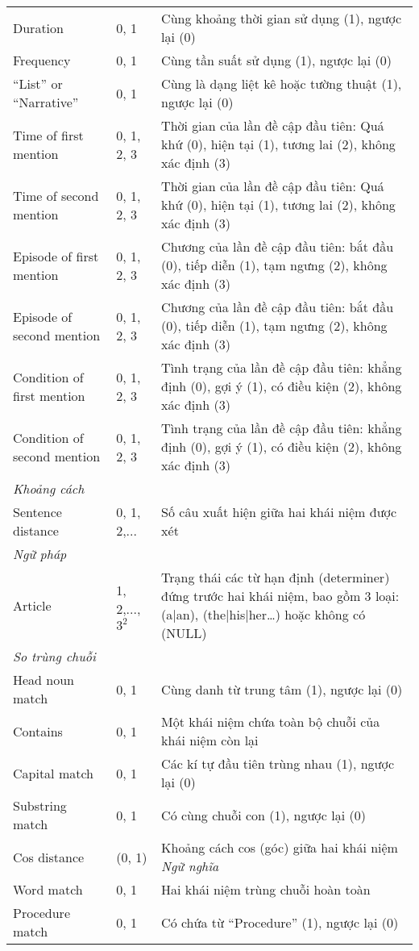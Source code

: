 \begin{table}[th]
\begin{tabularx}{\textwidth}{@{}P{\raggedright}{0.3}lL@{}}
Duration & 0, 1 & Cùng khoảng thời gian sử dụng (1), ngược lại (0)\\
Frequency & 0, 1 & Cùng tần suất sử dụng (1), ngược lại (0)\\
``List'' or ``Narrative'' & 0, 1 & Cùng là dạng liệt kê hoặc tường thuật (1), ngược lại (0)\\
Time of first mention & 0, 1, 2, 3 & Thời gian của lần đề cập đầu tiên: Quá khứ (0), hiện tại (1), tương lai (2), không xác định (3)\\
Time of second mention & 0, 1, 2, 3 & Thời gian của lần đề cập đầu tiên: Quá khứ (0), hiện tại (1), tương lai (2), không xác định (3)\\
Episode of first mention & 0, 1, 2, 3 & Chương của lần đề cập đầu tiên: bắt đầu (0), tiếp diễn (1), tạm ngưng (2), không xác định (3)\\
Episode of second mention & 0, 1, 2, 3 & Chương của lần đề cập đầu tiên: bắt đầu (0), tiếp diễn (1), tạm ngưng (2), không xác định (3)\\
Condition of first mention & 0, 1, 2, 3 & Tình trạng của lần đề cập đầu tiên: khẳng định (0), gợi ý (1), có điều kiện (2), không xác định (3)\\
Condition of second mention & 0, 1, 2, 3 & Tình trạng của lần đề cập đầu tiên: khẳng định (0), gợi ý (1), có điều kiện (2), không xác định (3)\\
\textit{Khoảng cách}\\
Sentence distance & 0, 1, 2,... & Số câu xuất hiện giữa hai khái niệm được xét\\
\textit{Ngữ pháp}\\
Article & 1, 2,..., $3^{2}$ & Trạng thái các từ hạn định (determiner) đứng trước hai khái niệm, bao gồm 3 loại: (a|an), (the|his|her…) hoặc không có (NULL)\\
\textit{So trùng chuỗi}\\
Head noun match & 0, 1 & Cùng danh từ trung tâm (1), ngược lại (0)\\
Contains & 0, 1 & Một khái niệm chứa toàn bộ chuỗi của khái niệm còn lại\\
Capital match & 0, 1 & Các kí tự đầu tiên trùng nhau (1), ngược lại (0)\\
Substring match & 0, 1 & Có cùng chuỗi con (1), ngược lại (0)\\
Cos distance & (0, 1) & Khoảng cách cos (góc) giữa hai khái niệm
\textit{Ngữ nghĩa}\\
Word match & 0, 1 & Hai khái niệm trùng chuỗi hoàn toàn\\
Procedure match & 0, 1 & Có chứa từ ``Procedure'' (1), ngược lại (0)\\
\bottomrule
\end{tabularx}
\end{table}

